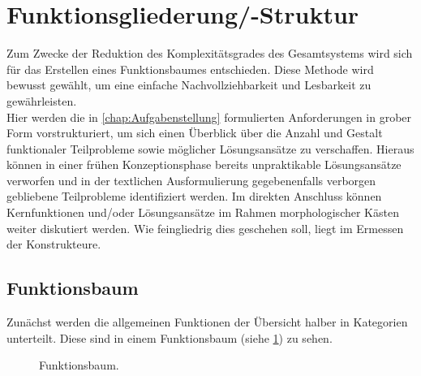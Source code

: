	\section{Funktionsgliederung/-Struktur}
		Zum Zwecke der Reduktion des Komplexitätsgrades des Gesamtsystems wird sich für das Erstellen eines Funktionsbaumes entschieden. Diese Methode wird bewusst gewählt, um eine einfache Nachvollziehbarkeit und Lesbarkeit zu gewährleisten.\\
		Hier werden die in \cref{chap:Aufgabenstellung} formulierten Anforderungen in grober Form vorstrukturiert, um sich einen Überblick über die Anzahl und Gestalt funktionaler Teilprobleme sowie möglicher Lösungsansätze zu verschaffen.
		Hieraus können in einer frühen Konzeptionsphase bereits unpraktikable Lösungsansätze verworfen und in der textlichen Ausformulierung gegebenenfalls verborgen gebliebene Teilprobleme identifiziert werden.
		Im direkten Anschluss können Kernfunktionen und/oder Lösungsansätze im Rahmen morphologischer Kästen weiter diskutiert werden.	Wie feingliedrig dies geschehen soll, liegt im Ermessen der Konstrukteure.

		\subsection{Funktionsbaum}
			Zunächst werden die allgemeinen Funktionen der Übersicht halber in Kategorien unterteilt. Diese sind in einem Funktionsbaum (siehe \cref{fig:funktionsbaum}) zu sehen.
			
			\begin{figure}[h]
				\centering
				
				\caption[Funktionsbaum]{Funktionsbaum.}\label{fig:funktionsbaum}
			\end{figure}

